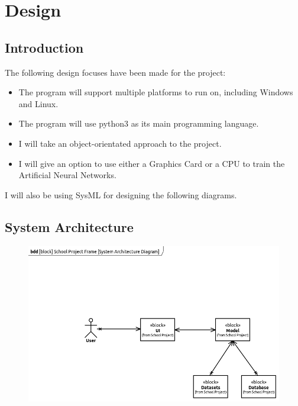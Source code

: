 \documentclass[./project-report/src/latex/project-report.tex]{subfiles}
\begin{document}
\maketitle

\section{Design}

\subsection{Introduction}

The following design focuses have been made for the project:

\begin{itemize}
    \item The program will support multiple platforms to run on, including Windows and Linux.
    \item The program will use python3 as its main programming language.
    \item I will take an object-orientated approach to the project.
    \item I will give an option to use either a Graphics Card or a CPU to train the Artificial Neural Networks.
\end{itemize}

I will also be using SysML for designing the following diagrams.

\subsection{System Architecture}

\begin{figure}[h!]
\centering
\includegraphics[width=1\textwidth]{./project-report/src/images/system-architecture-diagram.png}
\end{figure}
\end{document}
